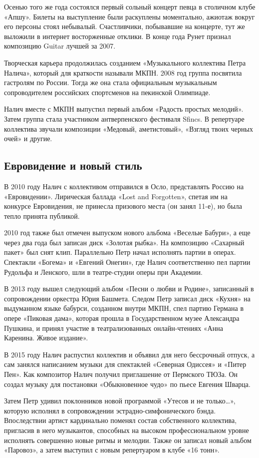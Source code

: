 Осенью того же года состоялся первый сольный концерт певца в столичном клубе «Апшу». Билеты на выступление были раскуплены моментально, ажиотаж вокруг его персоны стоял небывалый. Счастливчики, побывавшие на концерте, тут же выложили в интернет восторженные отклики. В конце года Рунет признал композицию Guitar лучшей за 2007.

Творческая карьера продолжилась созданием «Музыкального коллектива Петра Налича», который для краткости называли МКПН. 2008 год группа посвятила гастролям по России. Тогда же она стала официальным музыкальным сопроводителем российских спортсменов на пекинской Олимпиаде.

Налич вместе с МКПН выпустил первый альбом «Радость простых мелодий». Затем группа стала участником антверпенского фестиваля Sfincs. В репертуаре коллектива звучали композиции «Медовый, аметистовый», «Взгляд твоих черных очей» и другие.

\subsection{Евровидение и новый стиль}
В 2010 году Налич с коллективом отправился в Осло, представлять Россию на «Евровидении». Лирическая баллада «Lost and Forgotten», спетая им на конкурсе Евровидения, не принесла призового места (он занял 11-е), но была тепло принята публикой.

2010 год также был отмечен выпуском нового альбома «Веселые Бабури», а еще через два года был записан диск «Золотая рыбка». На композицию «Сахарный пакет» был снят клип. Параллельно Петр начал исполнять партии в операх. Спектакли «Богема» и «Евгений Онегин», где Налич соответственно пел партии Рудольфа и Ленского, шли в театре-студии оперы при Академии.

В 2013 году вышел следующий альбом «Песни о любви и Родине», записанный в сопровождении оркестра Юрия Башмета. Следом Петр записал диск «Кухня» на выдуманном языке бабурси, созданном внутри МКПН, спел партию Германа в опере «Пиковая дама», которая прошла в Государственном музее Александра Пушкина, и принял участие в театрализованных онлайн-чтениях «Анна Каренина. Живое издание».

В 2015 году Налич распустил коллектив и объявил для него бессрочный отпуск, а сам занялся написанием музыки для спектаклей «Северная Одиссея» и «Питер Пен». Как композитор Налич получил приглашение от Пермского ТЮЗа. Он создал музыку для постановки «Обыкновенное чудо» по пьесе Евгения Шварца.

Затем Петр удивил поклонников новой программой «Утесов и не только…», которую исполнял в сопровождении эстрадно-симфонического бэнда. Впоследствии артист кардинально поменял состав собственного коллектива, пригласив в него музыкантов, способных на высоком профессиональном уровне исполнять совершенно новые ритмы и мелодии. Также он записал новый альбом «Паровоз», а затем выступил с новым репертуаром в клубе «16 тонн».

